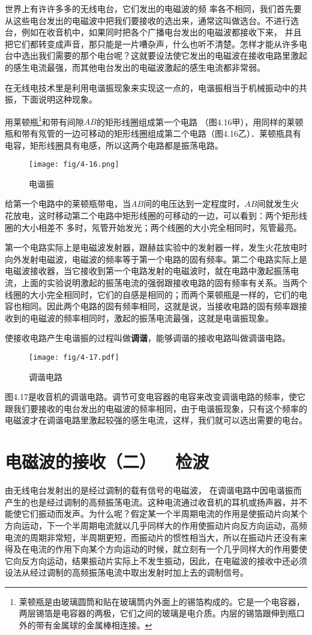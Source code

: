 世界上有许许多多的无线电台，它们发出的电磁波的频
率各不相同，我们首先要从这些电台发出的电磁波中把我们要接收的选出来，通常这叫做选台。不进行选台，例如在收音机中，如果同时把各个广播电台发出的电磁波都接收下来，
并且把它们都转变成声音，那只能是一片嘈杂声，什么也听不清楚。怎样才能从许多电台中选出我们需要的那个电台呢？这就要设法使它发出的电磁波在接收电路里激起的感生电流最强，而其他电台发出的电磁波激起的感生电流都非常弱。

在无线电技术里是利用电谐振现象来实现这一点的，电谐振相当于机械振动中的共振，下面说明这种现象。

用莱顿瓶\footnote{莱顿瓶是由玻璃圆筒和贴在玻璃筒内外面上的锡箔构成的。它是一个电容器，两层锡箔是电容器的两极，它们之间的玻璃是电介质。内层的锡箔跟伸到瓶口外的带有金属球的金属棒相连接。}和带有间隙$AB$的矩形线圈组成第一个电路
（图4.16甲），用同样的莱顿瓶和带有氖管的一边可移动的矩形线圈组成第二个电路（图4.16乙）．莱顿瓶具有电容，矩形线圈具有电感，所以这两个电路都是振荡电路。
\begin{figure}[htp]\centering
	\texttt{[image: fig/4-16.png]}
	\caption{电谐振}
	\end{figure}

给第一个电路中的莱顿瓶带电，当$AB$间的电压达到一定程度时，$AB$间就发生火花放电，这时移动第二个电路中矩形线圈的可移动的一边，可以看到：两个矩形线圈的大小相差不
多时，氖管开始发光；两个线圈的大小完全相同时，氖管最亮。

第一个电路实际上是电磁波发射器，跟赫兹实验中的发射器一样，发生火花放电时向外发射电磁波，电磁波的频率等于第一个电路的固有频率。第二个电路实际上是电磁波接收器，当它接收到第一个电路发射的电磁波时，就在电路中激起振荡电流，上面的实验说明激起的振荡电流的强弱跟接收电路的固有频率有关系。当两个线圈的大小完全相同时，它们的自感是相同的；而两个莱顿瓶是一样的，它们的电容也相同。因此两个电路的固有频率相同，这就是说，当接收电路的固有频率跟接收到的电磁波的频率相同时，激起的振荡电流最强，这就是电谐振现象。

使接收电路产生电谐振的过程叫做\textbf{调谐}，能够调谐的接收电路叫做调谐电路。
\begin{figure}[htp]\centering
	\texttt{[image: fig/4-17.pdf]}
	\caption{调谐电路}
	\end{figure}

图4.17是收音机的调谐电路。调节可变电容器的电容来改变调谐电路的频率，使它跟我们要接收的电台发出的电磁波的频率相同，由于电谐振现象，只有这个频率的电磁波才在调谐电路里激起较强的感生电流，这样，我们就可以选出需要的电台。

\section{电磁波的接收（二）~~检波}
由无线电台发射出的是经过调制的载有信号的电磁波，
在调谐电路中因电谐振而产生的也是经过调制的高频振荡电流。这种电流通过收音机的耳机或扬声器，并不能使它们振动而发声。为什么呢？假定某一个半周期电流的作用是使振动片向某个方向运动，下一个半周期电流就以几乎同样大的作用使振动片向反方向运动，高频电流的周期非常短，半周期更短，而振动片的惯性相当大，所以在振动片还没有来得及在电流的作用下向某个方向运动的时候，就立刻有一个几乎同样大的作用要使它向反方向运动，结果振动片实际上不发生振动，因此，在电磁波的接收中还必须设法从经过调制的高频振荡电流中取出发射时加上去的调制信号。


